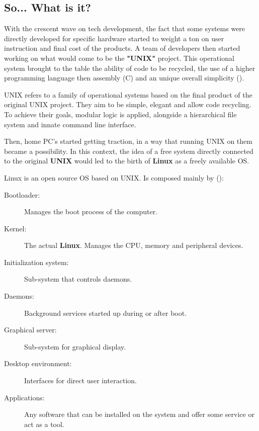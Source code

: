 \documentclass[a4paper,11pt]{article}
\begin{document}
\subsection{So... What is it?}
With the crescent wave on tech development, the fact that some systems were
directly developed for specific hardware started to weight a ton on user
instruction and final cost of the products. A team of developers then started
working on what would come to be the \textbf{"UNIX"} project. This operational system
brought to the table the ability of code to be recycled, the use of
a higher programming language then assembly (C) and an unique overall
simplicity (\cite{garrelsIntroductionLinux2008}).\par
\begin{definitionbox}
   UNIX refers to a family of operational systems based on the final product of
   the original UNIX project. They aim to be simple, elegant and allow code
   recycling. To achieve their goals, modular logic is applied, alongside
   a hierarchical file system and innate command line interface. 
\end{definitionbox}
Then, home PC's started getting traction, in a way that running UNIX on them
became a possibility. In this context, the idea of a free system directly
connected to the original \textbf{UNIX} would led to the birth of \textbf{Linux}
as a freely available OS.
\begin{definitionbox}
    Linux is an open source OS based on UNIX. Is composed mainly by
    (\cite{WhatLinux2025}):
    \begin{description}
        \item[Bootloader:] Manages the boot process of the computer.
        \item[Kernel:] The actual \textbf{Linux}. Manages the CPU, memory and
            peripheral devices.
        \item[Initialization system:] Sub-system that controls daemons.
        \item[Daemons:] Background services started up during or after boot.
        \item[Graphical server:] Sub-system for graphical display.
        \item[Desktop environment:] Interfaces for direct user interaction.
        \item[Applications:] Any software that can be installed on the system
            and offer some service or act as a tool.
    \end{description}
\end{definitionbox}
\end{document}
